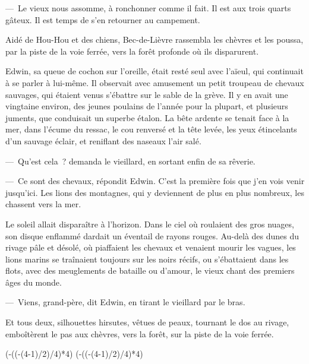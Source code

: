 \documentclass[french,twoside]{book} %
\newcommand\chapterclose{} %
\def\truncdiv#1#2{((#1-(#2-1)/2)/#2)}
\def\moduloop#1#2{(#1-\truncdiv{#1}{#2}*#2)}
\def\modulo#1#2{\number\numexpr\moduloop{#1}{#2}\relax}
\begin{document}
— Le vieux nous assomme, à ronchonner comme il fait. Il est aux trois quarts gâteux. Il est temps de s’en retourner au campement.\par
Aidé de Hou-Hou et des chiens, Bec-de-Lièvre rassembla les chèvres et les poussa, par la piste de la voie ferrée, vers la forêt profonde où ils disparurent.\par
Edwin, sa queue de cochon sur l’oreille, était resté seul avec l’aïeul, qui continuait à se parler à lui-même. Il observait avec amusement un petit troupeau de chevaux sauvages, qui étaient venus s’ébattre sur le sable de la grève. Il y en avait une vingtaine environ, des jeunes poulains de l’année pour la plupart, et plusieurs juments, que conduisait un superbe étalon. La bête ardente se tenait face à la mer, dans l’écume du ressac, le cou renversé et la tête levée, les yeux étincelants d’un sauvage éclair, et reniflant des naseaux l’air salé.\par
— Qu’est cela ? demanda le vieillard, en sortant enfin de sa rêverie.\par
— Ce sont des chevaux, répondit Edwin. C’est la première fois que j’en vois venir jusqu’ici. Les lions des montagnes, qui y deviennent de plus en plus nombreux, les chassent vers la mer.\par
Le soleil allait disparaître à l’horizon. Dans le ciel où roulaient des gros nuages, son disque enflammé dardait un éventail de rayons rouges. Au-delà des dunes du rivage pâle et désolé, où piaffaient les chevaux et venaient mourir les vagues, les lions marins se traînaient toujours sur les noirs récifs, ou s’ébattaient dans les flots, avec des meuglements de bataille ou d’amour, le vieux chant des premiers âges du monde.\par
— Viens, grand-père, dit Edwin, en tirant le vieillard par le bras.\par
Et tous deux, silhouettes hirsutes, vêtues de peaux, tournant le dos au rivage, emboîtèrent le pas aux chèvres, vers la forêt, sur la piste de la voie ferrée.\par
\bigbreak
\bigbreak
\chapterclose

 


\ifbooklet
  \pagestyle{empty}
  \clearpage
  \ifnum\modulo{\value{page}}{4}=0 \hbox{}\newpage\hbox{}\newpage\fi
  \ifnum\modulo{\value{page}}{4}=1 \hbox{}\newpage\hbox{}\newpage\fi
\end{document}
